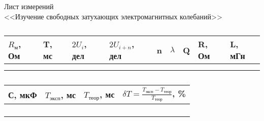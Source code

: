 \documentclass[a4paper,12pt]{article}
\begin{document}
	\newpage
	\pagestyle{fancy}
	
	\begin{center}
		{\Large Лист измерений}\\
		<<Изучение свободных затухающих электромагнитных колебаний>>
	\end{center}

\begin{table}[h]
	\caption{}
	\begin{tabularx}{\textwidth}{|X|X|X|X|X|X|X|X|X|}
		\hline 
		$R_\text{м}$, Ом & T, мс & $2U_i$, дел & $2U_{i+n}$, дел & n & $\lambda$ & Q & R, Ом & L, мГн \\ 
		\hline 
		&  &  &  &  &  &  &  &  \\ 
		\hline 
		&  &  &  &  &  &  &  &  \\ 
		\hline 
	\end{tabularx} 
\end{table}

\begin{table}[h]
\caption{}
\begin{tabularx}{\textwidth}{|X|X|X|X|}
	\hline 
	С, мкФ & $T_\text{эксп}$, мс & $T_\text{теор}$, мс & $\delta T=\frac{T_\text{эксп}-T_{теор}}{T_\text{теор}}$, \% \\ 
	\hline 
	&  &  &  \\ 
	\hline 
	&  &  &  \\ 
	\hline 
	&  &  &  \\ 
	\hline 
	&  &  &  \\ 
	\hline 
\end{tabularx} 
\end{table}
\end{document}
